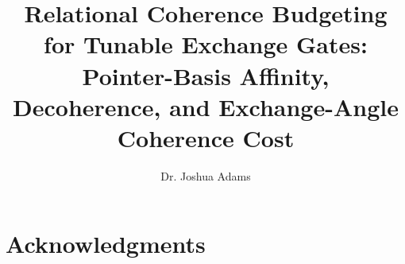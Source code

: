 \documentclass[a4paper,onecolumn,11pt,unpublished]{quantumarticle}
\begin{document}

\title{Relational Coherence Budgeting for Tunable Exchange Gates:
       Pointer-Basis Affinity, Decoherence, and Exchange-Angle
       Coherence Cost}

\author{Dr. Joshua Adams}

\maketitle

\begin{abstract}

\end{abstract}\newpage










\section*{Acknowledgments}


\appendix
\newpage



\end{document}
